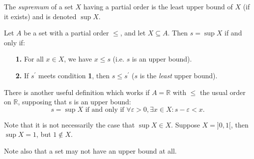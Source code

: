 \documentclass[12pt]{article}
\renewcommand{\leq}{\leqslant}
\begin{document}
The \emph{supremum} of a set $X$ having a partial order is the least upper bound of $X$ (if it exists) and is denoted $\sup{X}$.

Let $A$ be a set with a partial order $\leq$, and let $X \subseteq A$. Then $s = \sup X$ if and only if: \begin{enumerate}
\item[\textbf{1.}]{For all $x\in X$, we have $x \leq s$ (i.e. $s$ is an upper bound).}
\item[\textbf{2.}]{If $s^{\prime}$ meets condition \textbf{1}, then $s \leq s^{\prime}$ ($s$ is the \emph{least} upper bound).}
\end{enumerate}

There is another useful definition which works if $A = \mathbb{R}$ with $\leq$ the usual order on $\mathbb{R}$, supposing that s is an upper bound: \[s = \sup X \text{ if and only if } \forall \varepsilon > 0, \exists x\in X : s-\varepsilon < x.\]  

Note that it is not necessarily the case that $\sup X \in X$.  Suppose $X = {]0, 1[}$, then $\sup X = 1$, but $1 \not\in X$.

Note also that a set may not have an upper bound at all.
\end{document}

